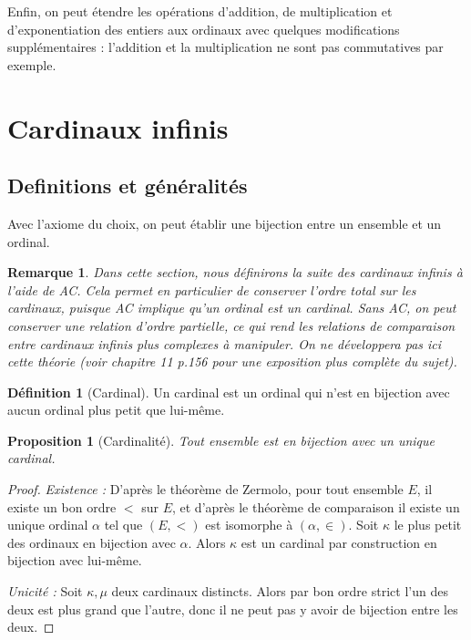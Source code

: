 \documentclass{article}
\theoremstyle{definition}
\newtheorem{definition}[subsubsection]{Définition}
\theoremstyle{plain}
\newtheorem{proposition}[subsubsection]{Proposition}
\theoremstyle{plain}
\theoremstyle{plain}
\theoremstyle{plain}
\newtheorem{remark}[subsubsection]{Remarque}
\theoremstyle{plain}
\begin{document}
\par Enfin, on peut étendre les opérations d'addition, de multiplication et d'exponentiation des entiers aux ordinaux avec quelques modifications supplémentaires : l'addition et la multiplication ne sont pas commutatives par exemple.

\clearpage
\section{Cardinaux infinis}
\subsection{Definitions et généralités}

\par Avec l'axiome du choix, on peut établir une bijection entre un ensemble et un ordinal.

\begin{remark}
	Dans cette section, nous définirons la suite des cardinaux infinis à l'aide de AC. Cela permet en particulier de conserver l'ordre total sur les cardinaux, puisque AC implique qu'un ordinal est un cardinal. Sans AC, on peut conserver une relation d'ordre partielle, ce qui rend les relations de comparaison entre cardinaux infinis plus complexes à manipuler. On ne développera pas ici cette théorie (voir \cite{jech1973axiom} chapitre 11 p.156 pour une exposition plus complète du sujet).
\end{remark}

\begin{definition}[Cardinal]
	Un cardinal est un ordinal qui n'est en bijection avec aucun ordinal plus petit que lui-même.
\end{definition}

\begin{proposition}[Cardinalité]
	Tout ensemble est en bijection avec un unique cardinal.
\end{proposition}
\begin{proof}	
	\textit{Existence :} D'après le théorème de Zermolo, pour tout ensemble \( E \), il existe un bon ordre \( < \) sur \( E \), et d'après le théorème de comparaison il existe un unique ordinal \( \alpha \) tel que \( (E,<) \) est isomorphe à \( (\alpha,\in) \). Soit \( \kappa \) le plus petit des ordinaux en bijection avec \( \alpha \). Alors \( \kappa \) est un cardinal par construction en bijection avec lui-même. 

	\textit{Unicité : } Soit \( \kappa, \mu \) deux cardinaux distincts. Alors par bon ordre strict l'un des deux est plus grand que l'autre, donc il ne peut pas y avoir de bijection entre les deux.
\end{proof}
\end{document}
